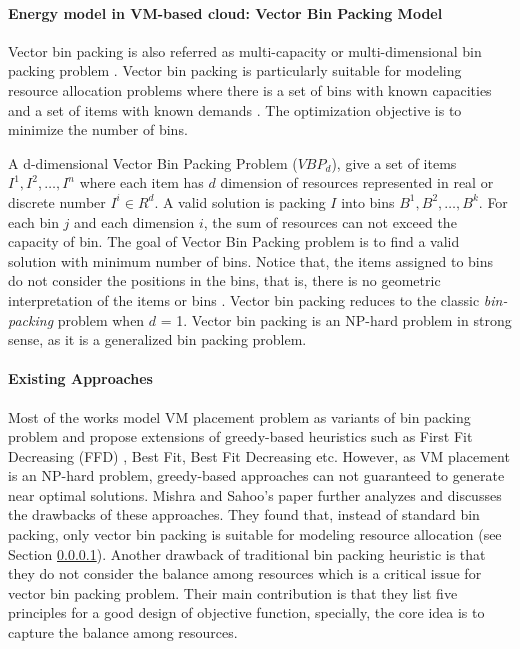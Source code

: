 \paragraph{Energy model in VM-based cloud: Vector Bin Packing Model}
\label{sec:vector_bin_packing}
 Vector bin packing is also referred as multi-capacity \cite{Leinberger:1999fs} or multi-dimensional bin packing problem \cite{Xiong:2014jq}. Vector bin packing is particularly suitable for modeling resource allocation problems where there is a set of bins with known capacities and a set of items with known demands \cite{Panigrahy:2011wk}. The optimization objective is to minimize the number of bins.

A d-dimensional Vector Bin Packing Problem ($VBP_d$), give a set of items $I^1, I^2, \dots, I^n$ where each item has $d$ dimension of resources represented in real or discrete number $I^i \in R^d$. A valid solution is packing $I$ into bins $B^1, B^2, \dots, B^k$. For each bin $j$ and each dimension $i$, the sum of resources can not exceed the capacity of bin. The goal of Vector Bin Packing problem is to find a valid solution with minimum number of bins. Notice that, the items assigned to bins do not consider the positions in the bins, that is, there is no geometric interpretation of the items or bins \cite{Johnson:2016wp}.  Vector bin packing reduces to the classic \emph{bin-packing} problem when $d$ = 1. Vector bin packing is an NP-hard problem in strong sense, as it is a generalized bin packing problem.







\paragraph{Existing Approaches}
Most of the works model VM placement problem as variants of bin packing problem and propose extensions of greedy-based heuristics such as First Fit Decreasing (FFD) \cite{Wood:2009fn}, Best Fit, Best Fit Decreasing \cite{Beloglazov:2010dt} etc. However, as VM placement is an NP-hard problem, greedy-based approaches can not guaranteed to generate near optimal solutions. Mishra and Sahoo's paper \cite{Mishra:2011bz} further analyzes and discusses the drawbacks of these approaches. They found that, instead of standard bin packing, only vector bin packing is suitable for modeling resource allocation (see Section \ref{sec:vector_bin_packing}). Another drawback of traditional bin packing heuristic is that they do not consider the balance among resources which is a critical issue for vector bin packing problem. Their main contribution is that they list five principles for a good design of objective function, specially, the core idea is to capture the balance among resources.

